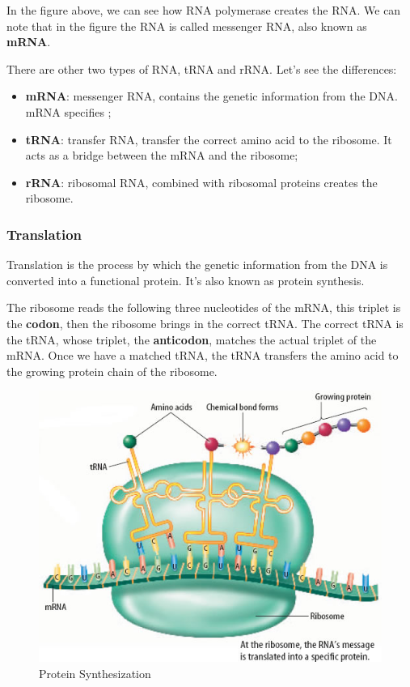 In the figure above, we can see how RNA polymerase creates the RNA. We can note that in the figure the RNA is called messenger RNA, also known as \textbf{mRNA}.

There are other two types of RNA, tRNA and rRNA. Let's see the differences:
\begin{itemize}
	\item \textbf{mRNA}: messenger RNA, contains the genetic information from the DNA. mRNA specifies ;
	\item \textbf{tRNA}: transfer RNA, transfer the correct amino acid to the ribosome. It acts as a bridge between the mRNA and the ribosome;
	\item \textbf{rRNA}: ribosomal RNA, combined with ribosomal proteins creates the ribosome.
\end{itemize}
\subsubsection{Translation}
Translation is the process by which the genetic information from the DNA is converted into a functional protein. It's also known as protein synthesis.

The ribosome reads the following three nucleotides of the mRNA, this triplet is the \textbf{codon}, then the ribosome brings in the correct tRNA. The correct tRNA is the tRNA, whose triplet, the \textbf{anticodon}, matches the actual triplet of the mRNA.
Once we have a matched tRNA, the tRNA transfers the amino acid to the growing protein chain of the ribosome.

\begin{figure}[h!]
	\includegraphics[scale=.6]{res/proteins_overview/protein_synth.jpeg}
	\centering
	\caption{Protein Synthesization}
	\label{fig:protein-synth}
\end{figure}

